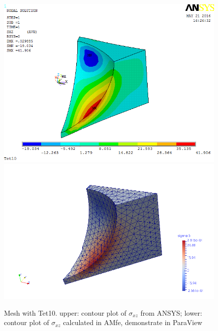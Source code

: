 \begin{figure}[htbp]
	\begin{center}
		\includegraphics[width=13cm,clip]{Tet10_Sxz.png} 		
		\includegraphics[width=13cm,clip]{Tet10_Sxz_P.png} 		
		\caption{Mesh with Tet10. upper: contour plot of $\sigma_{xz}$ from ANSYS; lower: contour plot of $\sigma_{xz}$ calculated in AMfe, demonstrate in ParaView} \label{fig: Tet10_Sxz}
	\end{center}
\end{figure}

\clearpage 

